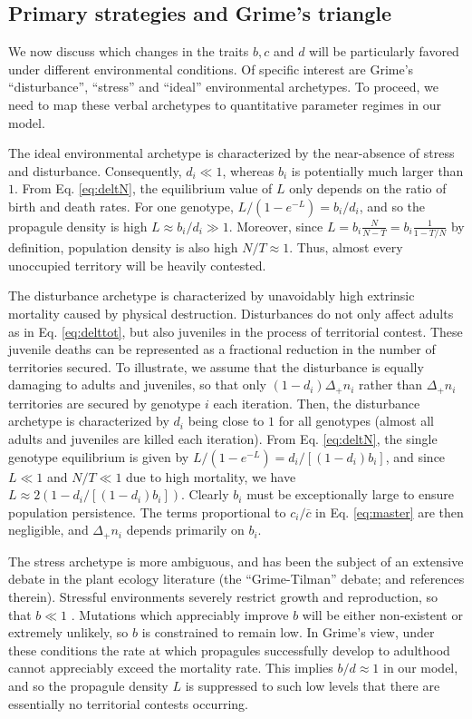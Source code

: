\documentclass[11pt]{article}
\begin{document}
\subsection*{Primary strategies and Grime's triangle}

We now discuss which changes in the traits $b, c$ and $d$ will be particularly favored under different environmental conditions. Of specific interest are Grime's ``disturbance'', ``stress'' and ``ideal'' environmental archetypes. To proceed, we need to map these verbal archetypes to quantitative parameter regimes in our model. 

The ideal environmental archetype is characterized by the near-absence of stress and disturbance. Consequently, $d_i\ll 1$, whereas $b_i$ is potentially much larger than $1$. From Eq. \eqref{eq:deltN}, the equilibrium value of $L$ only depends on the ratio of birth and death rates. For one genotype, $L/(1-e^{-L})=b_i/d_i$, and so the propagule density is high $L\approx b_i/d_i\gg 1$. Moreover, since $L=b_i\frac{N}{N-T}=b_i\frac{1}{1-T/N}$ by definition, population density is also high $N/T\approx 1$. Thus, almost every unoccupied territory will be heavily contested. 

The disturbance archetype is characterized by unavoidably high extrinsic mortality caused by physical destruction. Disturbances do not only affect adults as in Eq. \eqref{eq:delttot}, but also juveniles in the process of territorial contest. These juvenile deaths can be represented as a fractional reduction in the number of territories secured. To illustrate, we assume that the disturbance is equally damaging to adults and juveniles, so that only $(1-d_i)\Delta_+ n_i$ rather than $\Delta_+ n_i$ territories are secured by genotype $i$ each iteration. Then, the disturbance archetype is characterized by $d_i$ being close to $1$ for all genotypes (almost all adults and juveniles are killed each iteration). From Eq. \eqref{eq:deltN}, the single genotype equilibrium is given by $L/(1-e^{-L})=d_i/[(1-d_i)b_i]$, and since $L\ll 1$ and $N/T\ll 1$ due to high mortality, we have $L\approx 2(1-d_i/[(1-d_i)b_i])$. Clearly $b_i$ must be exceptionally large to ensure population persistence. The terms proportional to $c_i/\overline{c}$ in Eq. \eqref{eq:master} are then negligible, and $\Delta_+ n_i$ depends primarily on $b_i$. 

The stress archetype is more ambiguous, and has been the subject of an extensive debate in the plant ecology literature (the ``Grime-Tilman'' debate; \citealt{aerts_1999} and references therein). Stressful environments severely restrict growth and reproduction, so that $b\ll 1$ \cite{grime_1974,grime_1977}. Mutations which appreciably improve $b$ will be either non-existent or extremely unlikely, so $b$ is constrained to remain low. In Grime's view, under these conditions the rate at which propagules successfully develop to adulthood cannot appreciably exceed the mortality rate. This implies $b/d\approx 1$ in our model, and so the propagule density $L$ is suppressed to such low levels that there are essentially no territorial contests occurring. 
\end{document}
